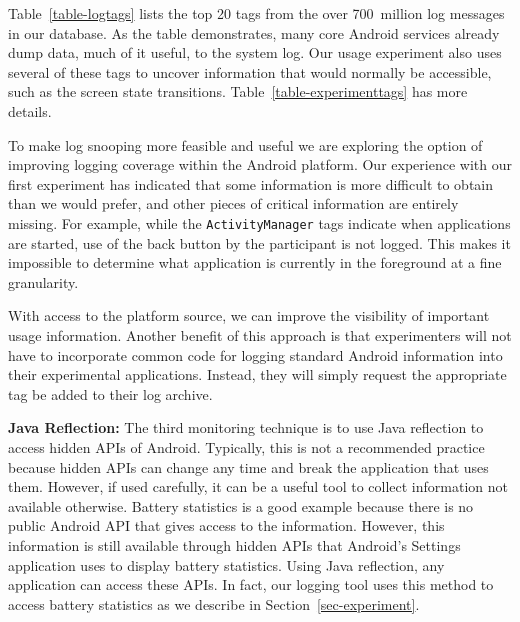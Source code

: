 Table~\ref{table-logtags} lists the top 20 tags from the over 700~million log
messages in our database. As the table demonstrates, many core Android
services already dump data, much of it useful, to the system log. Our usage
experiment also uses several of these tags to uncover information that would
normally be accessible, such as the screen state transitions.
Table~\ref{table-experimenttags} has more details.

To make log snooping more feasible and useful we are exploring the option of
improving logging coverage within the Android platform. Our experience with
our first experiment has indicated that some information is more difficult to
obtain than we would prefer, and other pieces of critical information are
entirely missing. For example, while the \texttt{ActivityManager} tags
indicate when applications are started, use of the back button by the
participant is not logged. This makes it impossible to determine what
application is currently in the foreground at a fine granularity.

With access to the platform source, we can improve the visibility of
important usage information. Another benefit of this approach is that
experimenters will not have to incorporate common code for logging standard
Android information into their experimental applications. Instead, they will
simply request the appropriate tag be added to their log archive.

{\bf Java Reflection:} The third monitoring technique is to use Java reflection
to access hidden APIs of Android. Typically, this is not a recommended practice
because hidden APIs can change any time and break the application that uses
them. However, if used carefully, it can be a useful tool to collect information
not available otherwise. Battery statistics is a good example because there is
no public Android API that gives access to the information. However, this
information is still available through hidden APIs that Android's Settings
application uses to display battery statistics. Using Java reflection, any
application can access these APIs. In fact, our logging tool uses this method to
access battery statistics as we describe in Section~\ref{sec-experiment}.

